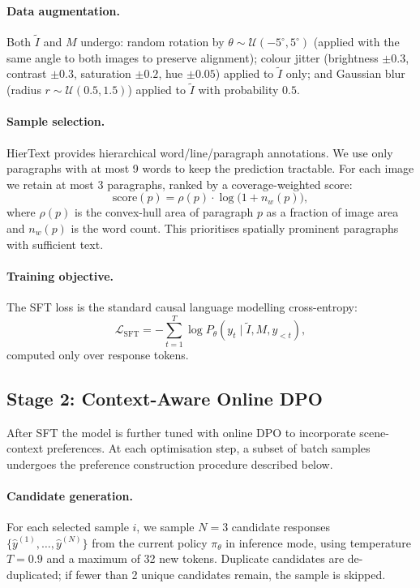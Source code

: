 \documentclass[uplatex,10pt,twocolumn,a4paper]{article}
\begin{document}
\paragraph{Data augmentation.}
Both $\tilde{I}$ and $M$ undergo: random rotation by $\theta \sim
\mathcal{U}(-5^\circ, 5^\circ)$ (applied with the same angle to both
images to preserve alignment); colour jitter (brightness $\pm 0.3$,
contrast $\pm 0.3$, saturation $\pm 0.2$, hue $\pm 0.05$) applied to
$\tilde{I}$ only; and Gaussian blur (radius $r \sim \mathcal{U}(0.5,
1.5)$) applied to $\tilde{I}$ with probability $0.5$.

\paragraph{Sample selection.}
HierText provides hierarchical word/line/paragraph annotations.
We use only paragraphs with at most 9 words to keep the prediction
tractable.
For each image we retain at most 3 paragraphs, ranked by a
coverage-weighted score:
\begin{equation}
  \text{score}(p) = \rho(p) \cdot \log\bigl(1 + n_w(p)\bigr),
  \label{eq:score}
\end{equation}
where $\rho(p)$ is the convex-hull area of paragraph $p$ as a fraction
of image area and $n_w(p)$ is the word count.
This prioritises spatially prominent paragraphs with sufficient text.

\paragraph{Training objective.}
The SFT loss is the standard causal language modelling cross-entropy:
\begin{equation}
  \mathcal{L}_\mathrm{SFT} = -\sum_{t=1}^{T} \log P_\theta(y_t \mid
  \tilde{I}, M, y_{<t}),
  \label{eq:sft}
\end{equation}
computed only over response tokens.

\subsection{Stage 2: Context-Aware Online DPO}
\label{sec:dpo}

After SFT the model is further tuned with online DPO to incorporate
scene-context preferences.
At each optimisation step, a subset of batch samples undergoes the
preference construction procedure described below.

\paragraph{Candidate generation.}
For each selected sample $i$, we sample $N=3$ candidate responses
$\{\hat{y}^{(1)}, \ldots, \hat{y}^{(N)}\}$ from the current policy
$\pi_\theta$ in inference mode, using temperature $T=0.9$ and a maximum
of 32 new tokens.
Duplicate candidates are de-duplicated; if fewer than 2 unique
candidates remain, the sample is skipped.
\end{document}
